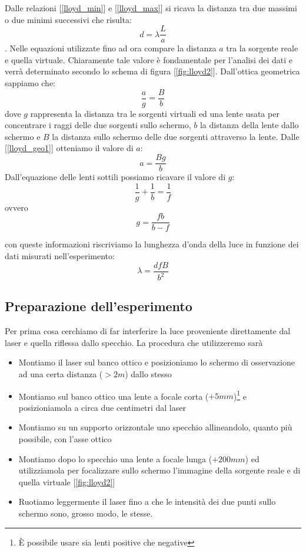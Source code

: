 \documentclass[a4paper,10pt,oneside]{article}
\begin{document}
Dalle relazioni [\ref{lloyd_min}] e [\ref{lloyd_max}] si ricava la distanza tra due massimi o due minimi successivi che risulta:
\begin{equation}
d=\lambda\frac{L}{a}
\end{equation}.
Nelle equazioni utilizzate fino ad ora compare la distanza $a$ tra la sorgente reale e quella virtuale. Chiaramente tale valore è fondamentale per l'analisi dei dati e verrà determinato secondo lo schema di figura [\ref{fig:lloyd2}]. Dall'ottica geometrica sappiamo che:
\begin{equation}\label{lloyd_geo1}
 \frac a g= \frac B b
\end{equation}
dove $g$ rappresenta la distanza tra le sorgenti virtuali ed una lente usata per concentrare i raggi delle due sorgenti sullo schermo, $b$ la distanza della lente dallo schermo e $B$ la distanza sullo schermo delle due sorgenti attraverso la lente.
Dalle [\ref{lloyd_geo1}] otteniamo il valore di $a$:
\begin{equation}
 a=\frac{Bg}{b}
\end{equation}
Dall'equazione delle lenti sottili possiamo ricavare il valore di $g$:
\begin{equation}
 \frac{1}{g}+\frac{1}{b}=\frac{1}{f}
\end{equation}
ovvero
\begin{equation}
 g=\frac{fb}{b-f}
\end{equation}

con queste informazioni riscriviamo la lunghezza d'onda della luce in funzione dei dati misurati nell'esperimento:
\begin{equation}\label{lloyd_4}
 \lambda=\frac{dfB}{b^2}
\end{equation}


\subsection*{Preparazione dell'esperimento}

Per prima cosa cerchiamo di far interferire la luce proveniente direttamente dal laser e quella riflessa dallo specchio. La procedura che utilizzeremo sarà
\begin{itemize}
 \item Montiamo il laser sul banco ottico e posizioniamo lo schermo di osservazione ad una certa distanza ($>2m$) dallo stesso
\item Montiamo sul banco ottico una lente a focale corta ($+5mm$)\footnote{È possibile usare sia lenti positive che negative} e posizioniamola a circa due centimetri dal  laser
\item Montiamo su un supporto orizzontale uno specchio allineandolo, quanto più possibile, con l'asse ottico
\item Montiamo dopo lo specchio una lente a focale lunga ($+200mm$) ed utilizziamola per focalizzare sullo schermo l'immagine della sorgente reale e di quella virtuale [\ref{fig:lloyd2}]
\item Ruotiamo leggermente il laser fino a che le intensità dei due punti sullo schermo sono, grosso modo, le stesse.
\end{itemize}
\end{document}
